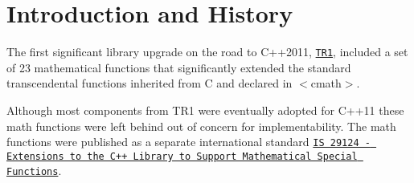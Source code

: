 \hypertarget{index_intro}{}\section{Introduction and History}\label{index_intro}
The first significant library upgrade on the road to C++2011, \href{http://www.open-std.org/JTC1/SC22/WG21/docs/papers/2005/n1836.pdf}{\tt T\+R1}, included a set of 23 mathematical functions that significantly extended the standard transcendental functions inherited from C and declared in $<$cmath$>$.

Although most components from T\+R1 were eventually adopted for C++11 these math functions were left behind out of concern for implementability. The math functions were published as a separate international standard \href{http://www.open-std.org/JTC1/SC22/WG21/docs/papers/2010/n3060.pdf}{\tt IS 29124 -\/ Extensions to the C++ Library to Support Mathematical Special Functions}.

